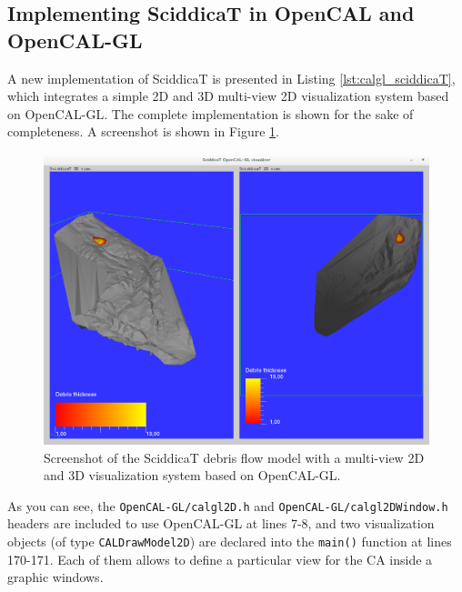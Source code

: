 \subsection{Implementing SciddicaT in OpenCAL and OpenCAL-GL}

A new implementation of SciddicaT is presented in Listing
\ref{lst:calgl_sciddicaT}, which integrates a simple 2D and 3D
multi-view 2D visualization system based on OpenCAL-GL. The complete
implementation is shown for the sake of completeness. A screenshot is
shown in Figure \ref{fig:calgl_sciddicaT1}.

\begin{figure}
  \begin{center}
    \includegraphics[width=12cm]{./images/OpenCAL/calgl_sciddicaT1}
    \caption{Screenshot of the SciddicaT debris flow model with a
      multi-view 2D and 3D visualization system based on OpenCAL-GL.}
    \label{fig:calgl_sciddicaT1}
  \end{center}
\end{figure}



As you can see, the \verb'OpenCAL-GL/calgl2D.h' and
\verb'OpenCAL-GL/calgl2DWindow.h' headers are included to use
OpenCAL-GL at lines 7-8, and two visualization objects (of type
\verb'CALDrawModel2D') are declared into the \verb'main()' function
at lines 170-171. Each of them allows to define a particular view for
the CA inside a graphic windows.


